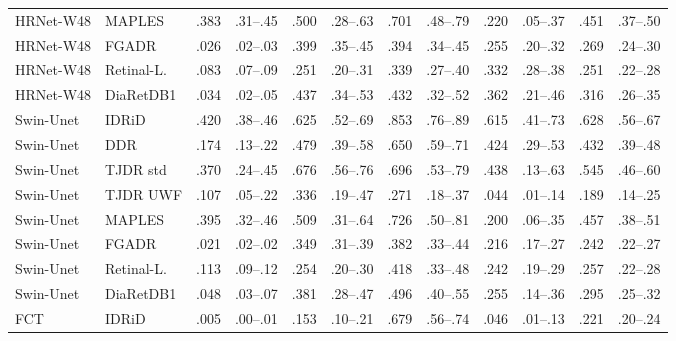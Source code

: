 \begin{landscape}
{\begin{longtable}{l l c c c c c c c c c c}
HRNet-W48 & MAPLES & .383 & \scriptsize .31--.45 & .500 & \scriptsize .28--.63 & .701 & \scriptsize .48--.79 & .220 & \scriptsize .05--.37 & .451 & \scriptsize .37--.50 \\
HRNet-W48 & FGADR & .026 & \scriptsize .02--.03 & .399 & \scriptsize .35--.45 & .394 & \scriptsize .34--.45 & .255 & \scriptsize .20--.32 & .269 & \scriptsize .24--.30 \\
HRNet-W48 & Retinal-L. & .083 & \scriptsize .07--.09 & .251 & \scriptsize .20--.31 & .339 & \scriptsize .27--.40 & .332 & \scriptsize .28--.38 & .251 & \scriptsize .22--.28 \\
HRNet-W48 & DiaRetDB1 & .034 & \scriptsize .02--.05 & .437 & \scriptsize .34--.53 & .432 & \scriptsize .32--.52 & .362 & \scriptsize .21--.46 & .316 & \scriptsize .26--.35 \\
Swin-Unet & IDRiD & .420 & \scriptsize .38--.46 & .625 & \scriptsize .52--.69 & .853 & \scriptsize .76--.89 & .615 & \scriptsize .41--.73 & .628 & \scriptsize .56--.67 \\
Swin-Unet & DDR & .174 & \scriptsize .13--.22 & .479 & \scriptsize .39--.58 & .650 & \scriptsize .59--.71 & .424 & \scriptsize .29--.53 & .432 & \scriptsize .39--.48 \\
Swin-Unet & TJDR std & .370 & \scriptsize .24--.45 & .676 & \scriptsize .56--.76 & .696 & \scriptsize .53--.79 & .438 & \scriptsize .13--.63 & .545 & \scriptsize .46--.60 \\
Swin-Unet & TJDR UWF & .107 & \scriptsize .05--.22 & .336 & \scriptsize .19--.47 & .271 & \scriptsize .18--.37 & .044 & \scriptsize .01--.14 & .189 & \scriptsize .14--.25 \\
Swin-Unet & MAPLES & .395 & \scriptsize .32--.46 & .509 & \scriptsize .31--.64 & .726 & \scriptsize .50--.81 & .200 & \scriptsize .06--.35 & .457 & \scriptsize .38--.51 \\
Swin-Unet & FGADR & .021 & \scriptsize .02--.02 & .349 & \scriptsize .31--.39 & .382 & \scriptsize .33--.44 & .216 & \scriptsize .17--.27 & .242 & \scriptsize .22--.27 \\
Swin-Unet & Retinal-L. & .113 & \scriptsize .09--.12 & .254 & \scriptsize .20--.30 & .418 & \scriptsize .33--.48 & .242 & \scriptsize .19--.29 & .257 & \scriptsize .22--.28 \\
Swin-Unet & DiaRetDB1 & .048 & \scriptsize .03--.07 & .381 & \scriptsize .28--.47 & .496 & \scriptsize .40--.55 & .255 & \scriptsize .14--.36 & .295 & \scriptsize .25--.32 \\
FCT & IDRiD & .005 & \scriptsize .00--.01 & .153 & \scriptsize .10--.21 & .679 & \scriptsize .56--.74 & .046 & \scriptsize .01--.13 & .221 & \scriptsize .20--.24 \\

\end{longtable}}
\end{landscape}
